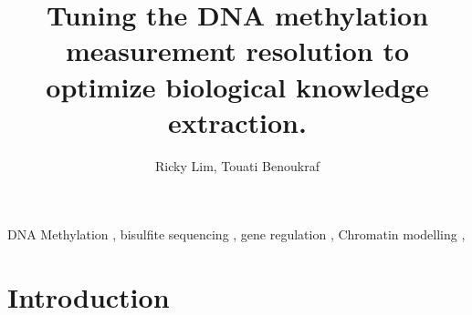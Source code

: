 \documentclass[review,12pt]{elsarticle}
\begin{document}
\begin{frontmatter}



\title{Tuning the DNA methylation measurement resolution to optimize biological knowledge extraction.}

\author[label1]{Ricky Lim, Touati Benoukraf}
\address[label1]{Cancer Science Institute of Singapore, National University of Singapore}

\author{}

\address{}

\begin{abstract}

\end{abstract}

\begin{keyword}
    DNA Methylation \sep
    bisulfite sequencing \sep
    gene regulation \sep
    Chromatin modelling \sep



\end{keyword}

\end{frontmatter}


\section{Introduction}
\end{document}
